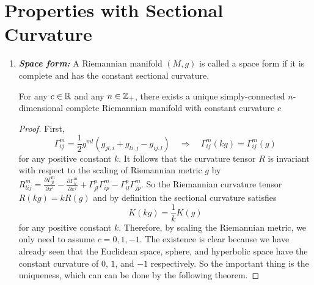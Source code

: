 \section{Properties with Sectional Curvature}

\begin{enumerate}[label=\arabic{*}.]
	\item \emph{\textbf{Space form:}} A Riemannian manifold $(M,g)$ is called a space form if it is complete and has the constant sectional curvature.
	\begin{thm}
		For any $c \in \mathbb{R}$ and any $n \in \mathbb{Z}_+$, there exists a unique simply-connected $n$-dimensional complete Riemannian manifold with constant curvature $c$
	\end{thm}
	\begin{proof}
		First,
		\begin{equation*}
			\Gamma_{i j}^m=\frac{1}{2} g^{m l}\left(g_{j l, i}+g_{l i, j}-g_{i j, l}\right)\quad \Rightarrow \quad \Gamma_{i j}^m(kg) = \Gamma_{i j}^m(g)
		\end{equation*}
		for any positive constant $k$. It follows that the curvature tensor $R$ is invariant with respect to the scaling of Riemannian metric $g$ by $R_{l i j}^m=\frac{\partial \Gamma_{j l}^m}{\partial x^i}-\frac{\partial \Gamma_{i l}^m}{\partial x^j}+\Gamma_{j l}^p \Gamma_{i p}^m-\Gamma_{i l}^p \Gamma_{j p}^m$. So the Riemannian curvature tensor $R(kg) = k R(g)$ and by definition the sectional curvature satisfies
		\begin{equation*}
			K(kg)=\frac{1}{k}K(g)
		\end{equation*}
		for any positive constant $k$. Therefore, by scaling the Riemannian metric, we only need to assume $c = 0,1,-1$. The existence is clear because we have already seen that the Euclidean space, sphere, and hyperbolic space have the constant curvature of $0$, $1$, and $-1$ respectively. So the important thing is the uniqueness, which can can be done by the following theorem.
	\end{proof}


\end{enumerate}
